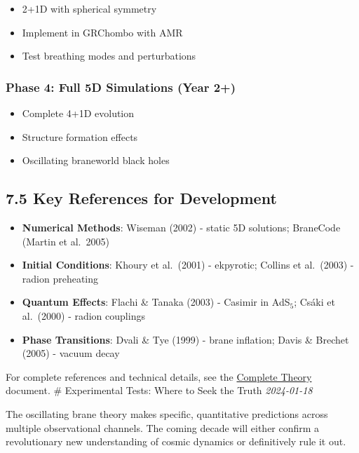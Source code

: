 \documentclass[
  11pt,
]{report}
\providecommand{\tightlist}{%
  \setlength{\itemsep}{0pt}\setlength{\parskip}{0pt}}
\begin{document}
\begin{itemize}
\tightlist
\item
  2+1D with spherical symmetry
\item
  Implement in GRChombo with AMR
\item
  Test breathing modes and perturbations
\end{itemize}

\subsubsection{Phase 4: Full 5D Simulations (Year
2+)}\label{phase-4-full-5d-simulations-year-2}

\begin{itemize}
\tightlist
\item
  Complete 4+1D evolution
\item
  Structure formation effects
\item
  Oscillating braneworld black holes
\end{itemize}

\subsection{7.5 Key References for
Development}\label{key-references-for-development}

\begin{itemize}
\tightlist
\item
  \textbf{Numerical Methods}: Wiseman (2002) - static 5D solutions;
  BraneCode (Martin et al.~2005)
\item
  \textbf{Initial Conditions}: Khoury et al.~(2001) - ekpyrotic; Collins
  et al.~(2003) - radion preheating
\item
  \textbf{Quantum Effects}: Flachi \& Tanaka (2003) - Casimir in
  AdS\(_5\); Csáki et al.~(2000) - radion couplings
\item
  \textbf{Phase Transitions}: Dvali \& Tye (1999) - brane inflation;
  Davis \& Brechet (2005) - vacuum decay
\end{itemize}

For complete references and technical details, see the
\href{/theory-complete/}{Complete Theory} document. \newpage \#
Experimental Tests: Where to Seek the Truth \emph{2024-01-18}

The oscillating brane theory makes specific, quantitative predictions
across multiple observational channels. The coming decade will either
confirm a revolutionary new understanding of cosmic dynamics or
definitively rule it out.
\end{document}
